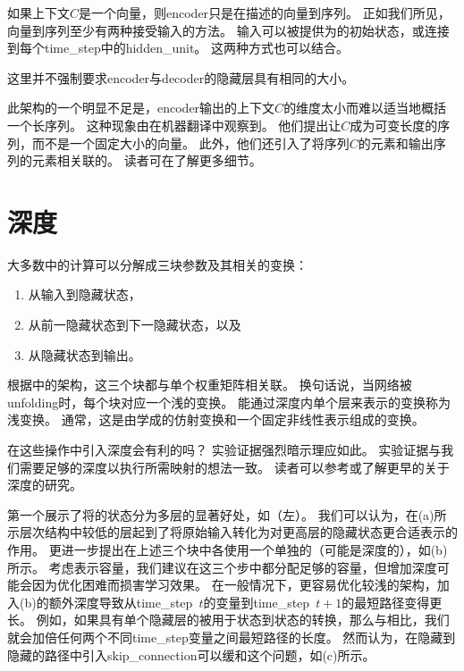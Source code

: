 如果上下文$C$是一个向量，则\gls{encoder}只是在描述的向量到序列。
正如我们所见，向量到序列至少有两种接受输入的方法。
输入可以被提供为的初始状态，或连接到每个\gls{time_step}中的\gls{hidden_unit}。
这两种方式也可以结合。

这里并不强制要求\gls{encoder}与\gls{decoder}的隐藏层具有相同的大小。

此架构的一个明显不足是，\gls{encoder}输出的上下文$C$的维度太小而难以适当地概括一个长序列。
这种现象由\cite{Bahdanau-et-al-ICLR2015-small}在机器翻译中观察到。
他们提出让$C$成为可变长度的序列，而不是一个固定大小的向量。
此外，他们还引入了将序列$C$的元素和输出序列的元素相关联的。
读者可在了解更多细节。


\section{深度}
\label{sec:deep_recurrent_networks}
大多数中的计算可以分解成三块参数及其相关的变换：
\begin{enumerate}
 \item 从输入到隐藏状态，
 \item 从前一隐藏状态到下一隐藏状态，以及
 \item 从隐藏状态到输出。
\end{enumerate}
根据中的架构，这三个块都与单个权重矩阵相关联。
换句话说，当网络被\gls{unfolding}时，每个块对应一个浅的变换。
能通过深度内单个层来表示的变换称为浅变换。
通常，这是由学成的仿射变换和一个固定非线性表示组成的变换。

在这些操作中引入深度会有利的吗？
实验证据\citep{Graves-arxiv2013,Pascanu-et-al-ICLR2014}强烈暗示理应如此。
实验证据与我们需要足够的深度以执行所需映射的想法一致。
读者可以参考\cite{Schmidhuber96,ElHihi+Bengio-nips8}或\cite{Jaeger2007}了解更早的关于深度的研究。

\cite{Graves-arxiv2013}第一个展示了将的状态分为多层的显著好处，如（左）。
我们可以认为，在(a)所示层次结构中较低的层起到了将原始输入转化为对更高层的隐藏状态更合适表示的作用。
\cite{Pascanu-et-al-ICLR2014}更进一步提出在上述三个块中各使用一个单独的（可能是深度的），如(b)所示。
考虑表示容量，我们建议在这三个步中都分配足够的容量，但增加深度可能会因为优化困难而损害学习效果。
在一般情况下，更容易优化较浅的架构，加入(b)的额外深度导致从\gls{time_step}~$t$的变量到\gls{time_step}~$t+1$的最短路径变得更长。
例如，如果具有单个隐藏层的被用于状态到状态的转换，那么与相比，我们就会加倍任何两个不同\gls{time_step}变量之间最短路径的长度。
然而\cite{Pascanu-et-al-ICLR2014}认为，在隐藏到隐藏的路径中引入\gls{skip_connection}可以缓和这个问题，如(c)所示。

